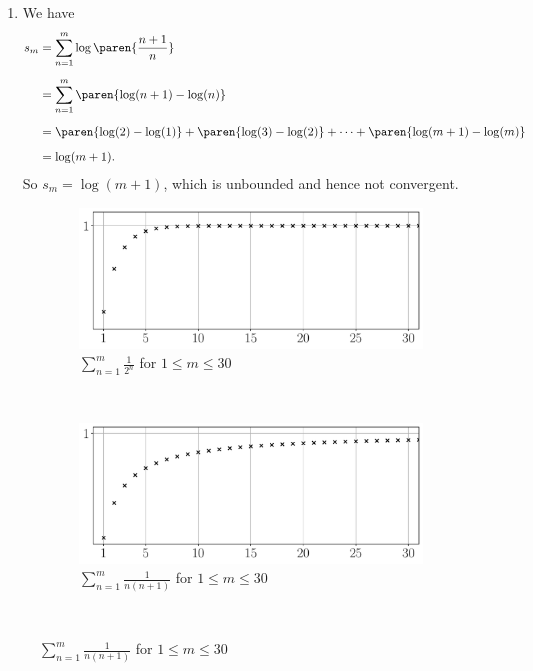 \documentclass{lew98_solutions}
\begin{document}
\begin{solution}
\begin{enumerate}
        \item We have
        \begin{align*}
            s_m &= \sum_{n=1}^m \log \paren{ \frac{n+1}{n} } \\[2mm]
            &= \sum_{n=1}^m \paren{ \log(n+1) - \log(n) } \\[2mm]
            &= \paren{ \log(2) - \log(1) } + \paren{ \log(3) - \log(2) } + \cdots + \paren{ \log(m+1) - \log(m) } \\[2mm]
            &= \log(m+1).
        \end{align*}
        So \( s_m = \log(m+1) \), which is unbounded and hence not convergent.
    \end{enumerate}
    \begin{figure}[H]
        \centering
        \begin{subfigure}{0.75\textwidth}
            \includegraphics[width=\textwidth]{UA_Figures/UA_ex2_4_8_fig_a.pdf}
            \caption{\( \sum_{n=1}^m \tfrac{1}{2^n} \) for \( 1 \leq m \leq 30 \)}
        \end{subfigure} \\
        \begin{subfigure}{0.75\textwidth}
            \includegraphics[width=\textwidth]{UA_Figures/UA_ex2_4_8_fig_b.pdf}
            \caption{\( \sum_{n=1}^m \tfrac{1}{n(n+1)} \) for \( 1 \leq m \leq 30 \)}
        \end{subfigure} \\

\end{figure}
\end{solution}
\end{document}

